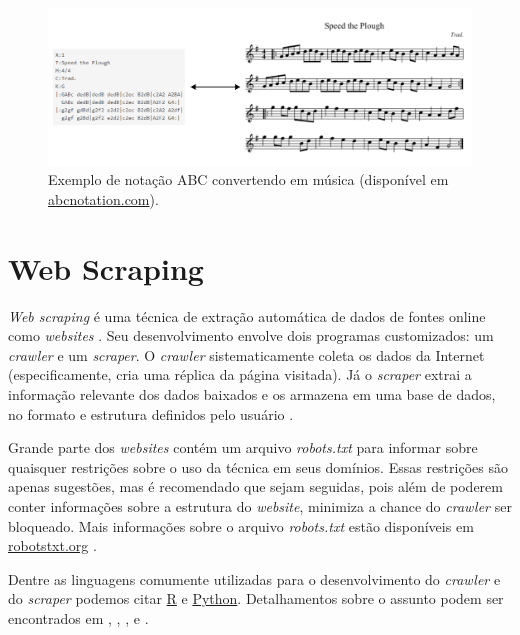 \documentclass{automatextcc}
\begin{document}
\begin{figure}[H]
    \centering
    \includegraphics[width=\textwidth]{figuras/abc_notation_example.pdf}
	\caption{Exemplo de notação ABC convertendo em música (disponível em \href{https://abcnotation.com}{\url{abcnotation.com}}).}
\end{figure}


\section{Web Scraping}
\textit{Web scraping} é uma técnica de extração automática de dados de fontes online como \textit{websites} \citep{farley2017,khder2021}. Seu desenvolvimento envolve dois programas customizados: um \textit{crawler} e um \textit{scraper}. O \textit{crawler} sistematicamente coleta os dados da Internet (especificamente, cria uma réplica da página visitada). Já o \textit{scraper} extrai a informação relevante dos dados baixados e os armazena em uma base de dados, no formato e estrutura definidos pelo usuário \citep{lawson2015,patil2016}.

Grande parte dos \textit{websites} contém um arquivo \textit{robots.txt} para informar sobre quaisquer restrições sobre o uso da técnica em seus domínios. Essas restrições são apenas sugestões, mas é recomendado que sejam seguidas, pois além de poderem conter informações sobre a estrutura do \textit{website}, minimiza a chance do \textit{crawler} ser bloqueado. Mais informações sobre o arquivo \textit{robots.txt} estão disponíveis em \url{robotstxt.org} \citep{lawson2015}.

Dentre as linguagens comumente utilizadas para o desenvolvimento do \textit{crawler} e do \textit{scraper} podemos citar \href{https://cran.r-project.org}{R} e \href{https://python.org/}{Python}. Detalhamentos sobre o assunto podem ser encontrados em \citet{lawson2015}, \citet{sirisuriya2015}, \citet{patil2016}, \citet{farley2017} e \citet{khder2021}.
\end{document}
